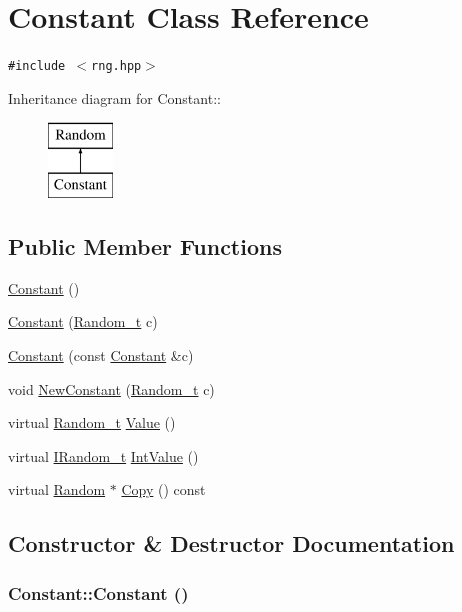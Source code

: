 \hypertarget{classConstant}{
\section{Constant Class Reference}
\label{classConstant}
}
{\tt \#include $<$rng.hpp$>$}

Inheritance diagram for Constant::\begin{figure}[H]
\begin{center}
\leavevmode
\includegraphics[height=2cm]{classConstant}
\end{center}
\end{figure}
\subsection*{Public Member Functions}
\begin{CompactItemize}
\item 
\hyperlink{classConstant_6d2f7d070d22aed4a3371c181da67716}{Constant} ()
\item 
\hyperlink{classConstant_df7e77573a679532a767f9557ed1745c}{Constant} (\hyperlink{rng_8hpp_ad41e7f5d86b1109b6a6a032c86cdd3f}{Random\_\-t} c)
\item 
\hyperlink{classConstant_0b4f8d8027a80d77b80ff8a186bd3c12}{Constant} (const \hyperlink{classConstant}{Constant} \&c)
\item 
void \hyperlink{classConstant_e5015bfe8179938344b0730e567929b0}{NewConstant} (\hyperlink{rng_8hpp_ad41e7f5d86b1109b6a6a032c86cdd3f}{Random\_\-t} c)
\item 
virtual \hyperlink{rng_8hpp_ad41e7f5d86b1109b6a6a032c86cdd3f}{Random\_\-t} \hyperlink{classConstant_8c4e39053835302870f15f5bbf0dc29e}{Value} ()
\item 
virtual \hyperlink{rng_8hpp_eb0f2eb55a063defa69eab89c6c0f695}{IRandom\_\-t} \hyperlink{classConstant_e7b431ef8fb785186bb846d23b5ccb95}{IntValue} ()
\item 
virtual \hyperlink{classRandom}{Random} $\ast$ \hyperlink{classConstant_47fc42d1d87bddf581084ae6b495ab2f}{Copy} () const 
\end{CompactItemize}


\subsection{Constructor \& Destructor Documentation}
\hypertarget{classConstant_6d2f7d070d22aed4a3371c181da67716}{
\subsubsection[{Constant}]{\setlength{\rightskip}{0pt plus 5cm}Constant::Constant ()}}
\label{classConstant_6d2f7d070d22aed4a3371c181da67716}


